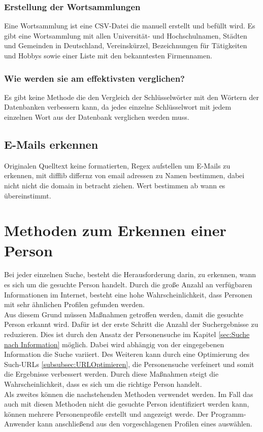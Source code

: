 		\subsubsection{Erstellung der Wortsammlungen}	
		Eine Wortsammlung ist eine CSV-Datei die manuell erstellt und befüllt wird. Es gibt eine Wortsammlung mit allen Universität- und Hochschulnamen, Städten und Gemeinden in Deutschland, Vereinskürzel, Bezeichnungen für Tätigkeiten und Hobbys sowie einer Liste mit den bekanntesten Firmennamen. 
		\subsubsection{Wie werden sie am effektivsten verglichen?}
		Es gibt keine Methode die den Vergleich der Schlüsselwörter mit den Wörtern der Datenbanken verbessern kann, da jedes einzelne Schlüsselwort mit jedem einzelnen Wort aus der Datenbank verglichen werden muss.
		
	\subsection{E-Mails erkennen}
	Originalen Quelltext keine formatierten, Regex aufstellen um E-Mails zu erkennen, mit difflib differnz von email adressen zu Namen bestimmen, dabei nicht nicht die domain in betracht ziehen. Wert bestimmen ab wann es übereinstimmt.
		
\section{Methoden zum Erkennen einer Person}
\label{sec:WannhandeltessichumdiegesuchtePerson}
Bei jeder einzelnen Suche, besteht die Herausforderung darin, zu erkennen, wann es sich um die gesuchte Person handelt. Durch die große Anzahl an verfügbaren Informationen im Internet, besteht eine hohe Wahrscheinlichkeit, dass Personen mit sehr ähnlichen Profilen gefunden werden.\\
Aus diesem Grund müssen Maßnahmen getroffen werden, damit die gesuchte Person erkannt wird. Dafür ist der erste Schritt die Anzahl der Suchergebnisse zu reduzieren. Dies ist durch den Ansatz der Personensuche im Kapitel \ref{sec:Suche nach Information} möglich. Dabei wird abhängig von der eingegebenen Information die Suche variiert. Des Weiteren kann durch eine Optimierung des Such-URLs \ref{subsubsec:URLOptimieren}, die Personensuche verfeinert und somit die Ergebnisse verbessert werden. Durch diese Maßnahmen steigt die Wahrscheinlichkeit, dass es sich um die richtige Person handelt.\\
Als zweites können die nachstehenden Methoden verwendet werden. Im Fall das auch mit diesen Methoden nicht die gesuchte Person identifiziert werden kann, können mehrere Personenprofile erstellt und angezeigt werde. Der Programm-Anwender kann anschließend aus den vorgeschlagenen Profilen eines auswählen.
	
